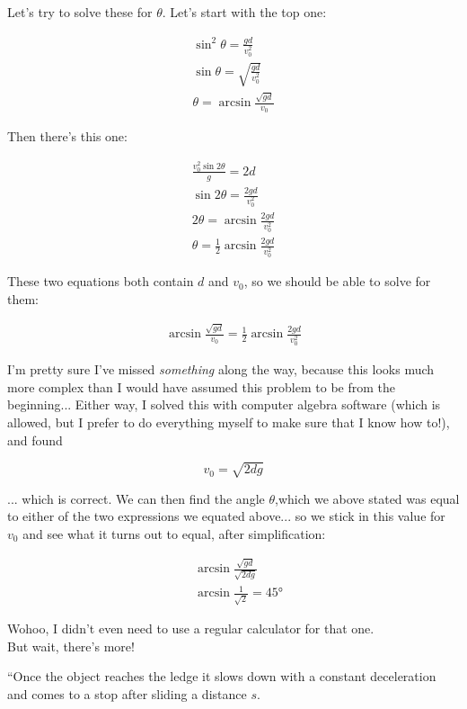 \documentclass[12pt,a4paper]{report}
\begin{document}
Let's try to solve these for $\theta$. Let's start with the top one:

\begin{align}
\sin^2 \theta = \frac{g d}{v_0^2}\\
\sin \theta = \sqrt{\frac{g d}{v_0^2}}\\
\theta = \arcsin \frac{\sqrt{g d}}{v_0}
\end{align}

Then there's this one:

\begin{align}
\frac{v_0^2 \sin 2\theta}{g} = 2d\\
\sin 2\theta = \frac{2 g d}{v_0^2}\\
2\theta = \arcsin \frac{2 g d}{v_0^2}\\
\theta = \frac{1}{2} \arcsin \frac{2 g d}{v_0^2}
\end{align}

These two equations both contain $d$ and $v_0$, so we should be able to solve for them:

\begin{align}
\arcsin \frac{\sqrt{g d}}{v_0} = \frac{1}{2} \arcsin \frac{2 g d}{v_0^2}
\end{align}

I'm pretty sure I've missed \emph{something} along the way, because this looks much more complex than I would have assumed this problem to be from the beginning... Either way, I solved this with computer algebra software (which is allowed, but I prefer to do everything myself to make sure that I know how to!), and found

\begin{equation}
v_0 = \sqrt{2 d g}
\end{equation}

... which is correct. We can then find the angle $\theta$,which we above stated was equal to either of the two expressions we equated above... so we stick in this value for $v_0$ and see what it turns out to equal, after simplification:

\begin{align}
&\arcsin \frac{\sqrt{g d}}{\sqrt{2 d g}}\\
&\arcsin \frac{1}{\sqrt{2}} = \ang{45}
\end{align}

Wohoo, I didn't even need to use a regular calculator for that one.\\
But wait, there's more!

``Once the object reaches the ledge it slows down with a constant deceleration and comes to a stop after sliding a distance $s$.
\end{document}

